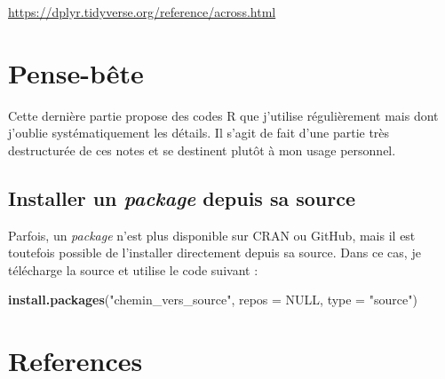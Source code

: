 \documentclass[
  11pt,
]{book}
\newenvironment{Shaded}{\begin{snugshade}}{\end{snugshade}}
\newcommand{\DataTypeTok}[1]{\textcolor[rgb]{0.13,0.29,0.53}{#1}}
\newcommand{\KeywordTok}[1]{\textcolor[rgb]{0.13,0.29,0.53}{\textbf{#1}}}
\newcommand{\NormalTok}[1]{#1}
\newcommand{\OtherTok}[1]{\textcolor[rgb]{0.56,0.35,0.01}{#1}}
\newcommand{\StringTok}[1]{\textcolor[rgb]{0.31,0.60,0.02}{#1}}
\numberwithin{equation}{section}
\numberwithin{countremarque}{section}
\begin{document}
\url{https://dplyr.tidyverse.org/reference/across.html}

\hypertarget{pense-buxeate}{%
\chapter{Pense-bête}\label{pense-buxeate}}

Cette dernière partie propose des codes R que j'utilise régulièrement mais dont j'oublie systématiquement les détails. Il s'agit de fait d'une partie très destructurée de ces notes et se destinent plutôt à mon usage personnel.

\hypertarget{installer-un-package-depuis-sa-source}{%
\section{\texorpdfstring{Installer un \emph{package} depuis sa source}{Installer un package depuis sa source}}\label{installer-un-package-depuis-sa-source}}

Parfois, un \emph{package} n'est plus disponible sur CRAN ou GitHub, mais il est toutefois possible de l'installer directement depuis sa source. Dans ce cas, je télécharge la source et utilise le code suivant :

\begin{Shaded}
\begin{Highlighting}[]
\KeywordTok{install.packages}\NormalTok{(}\StringTok{"chemin\_vers\_source"}\NormalTok{, }\DataTypeTok{repos =} \OtherTok{NULL}\NormalTok{, }\DataTypeTok{type =} \StringTok{"source"}\NormalTok{)}
\end{Highlighting}
\end{Shaded}

\hypertarget{references}{%
\chapter*{References}\label{references}}
\end{document}
